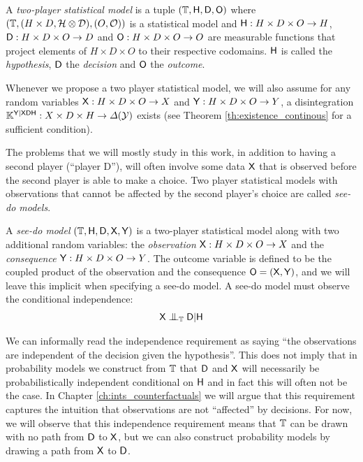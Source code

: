 \begin{definition}\label{def:2p_stat}
A \emph{two-player statistical model} is a tuple $(\mathbb{T},\mathsf{H},\mathsf{D},\mathsf{O})$ where $(\mathbb{T},(H\times D,\mathcal{H}\otimes\mathcal{D}), (O,\mathcal{O}))$ is a statistical model and $\mathsf{H}:H\times D\times O\to H$, $\mathsf{D}:H\times D\times O\to D$ and $\mathsf{O}:H\times D\times O\to O$ are measurable functions that project elements of $H\times D\times O$ to their respective codomains. $\mathsf{H}$ is called the \emph{hypothesis}, $\mathsf{D}$ the \emph{decision} and $\mathsf{O}$ the \emph{outcome}.
\end{definition}

Whenever we propose a two player statistical model, we will also assume for any random variables $\mathsf{X}: H\times D\times O\to X$ and $\mathsf{Y}:H\times D\times O\to Y$, a disintegration $\mathbb{K}^{\mathsf{Y}|\mathsf{XDH}}:X\times D\times H\to \Delta(\mathcal{Y})$ exists (see Theorem \ref{th:existence_continous} for a sufficient condition).

The problems that we will mostly study in this work, in addition to having a second player (``player D''), will often involve some data $\mathsf{X}$ that is observed before the second player is able to make a choice. Two player statistical models with observations that cannot be affected by the second player's choice are called \emph{see-do models}.

\begin{definition}\label{def:seedo}
A \emph{see-do model} $(\mathbb{T},\mathsf{H},\mathsf{D},\mathsf{X},\mathsf{Y})$ is a two-player statistical model along with two additional random variables: the \emph{observation} $\mathsf{X}: H\times D\times O\to X$ and the \emph{consequence} $\mathsf{Y}:H\times D\times O\to Y$. The outcome variable is defined to be the coupled product of the observation and the consequence $\mathsf{O}=(\mathsf{X},\mathsf{Y})$, and we will leave this implicit when specifying a see-do model. A see-do model must observe the conditional independence:
\begin{align}
\RV{X}\CI_\kernel{T} \RV{D}|\RV{H} \label{eq:see_do_independence_requirement}
\end{align}
\end{definition}

We can informally read the independence requirement as saying ``the observations are independent of the decision given the hypothesis''. This does not imply that in probability models we construct from $\mathbb{T}$ that $\mathsf{D}$ and $\mathsf{X}$ will necessarily be probabilistically independent conditional on $\mathsf{H}$ and in fact this will often not be the case. In Chapter \ref{ch:ints_counterfactuals} we will argue that this requirement captures the intuition that observations are not ``affected'' by decisions. For now, we will observe that this independence requirement means that $\mathbb{T}$ can be drawn with no path from $\mathsf{D}$ to $\mathsf{X}$, but we can also construct probability models by drawing a path from $\mathsf{X}$ to $\mathsf{D}$.

